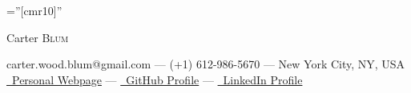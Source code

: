 \documentclass[a4paper,10pt]{article}
\newcommand{\link}[2]{\href{#1}{\faPaperclip \ #2}}
\begin{document}
\vspace*{-1.7cm}

\titlespacing{\section}{0pt}{2mm}{2mm}
\pagestyle{empty} %

\font\fb=''[cmr10]'' %


\bigskip
\centering
		{\Huge Carter \textsc{Blum}
	}\bigskip
\begin{center}
carter.wood.blum@gmail.com --- (+1) 612-986-5670 --- New York City, NY, USA\\
\link{https://blumx116.github.io}{Personal Webpage} --- \link{https://github.com/blumx116}{GitHub Profile} --- \link{https://www.linkedin.com/in/carter-blum/}{LinkedIn Profile}
\end{center}
\end{document}
